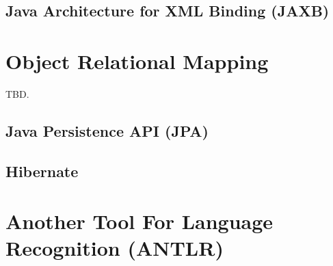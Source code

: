 \subsection{Java Architecture for XML Binding (JAXB)}

\section{Object Relational Mapping}
TBD.



\subsection{Java Persistence API (JPA)}

\subsection{Hibernate}



\section{Another Tool For Language Recognition (ANTLR)}

